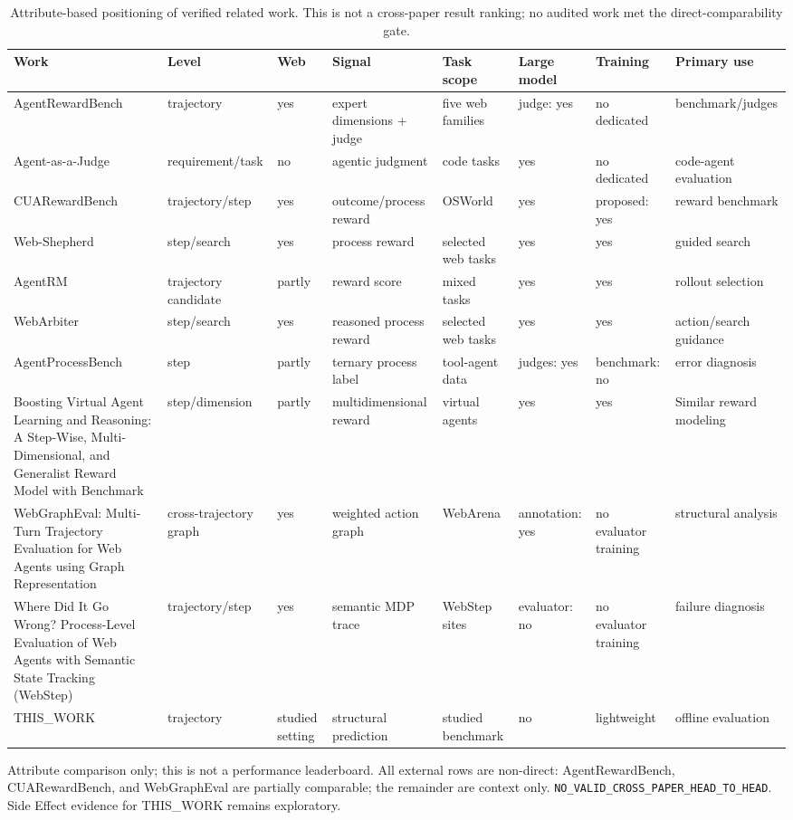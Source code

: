 \begin{table}[t]
\centering
\small
\caption{Attribute-based positioning of verified related work. This is not a cross-paper result ranking; no audited work met the direct-comparability gate.}
\label{tab:related_work_positioning}
\begin{tabular}{p{}p{}p{}p{}p{}p{}p{}p{}}
\hline
Work & Level & Web & Signal & Task scope & Large model & Training & Primary use \\
\hline
AgentRewardBench & trajectory & yes & expert dimensions + judge & five web families & judge: yes & no dedicated & benchmark/judges \\
Agent-as-a-Judge & requirement/task & no & agentic judgment & code tasks & yes & no dedicated & code-agent evaluation \\
CUARewardBench & trajectory/step & yes & outcome/process reward & OSWorld & yes & proposed: yes & reward benchmark \\
Web-Shepherd & step/search & yes & process reward & selected web tasks & yes & yes & guided search \\
AgentRM & trajectory candidate & partly & reward score & mixed tasks & yes & yes & rollout selection \\
WebArbiter & step/search & yes & reasoned process reward & selected web tasks & yes & yes & action/search guidance \\
AgentProcessBench & step & partly & ternary process label & tool-agent data & judges: yes & benchmark: no & error diagnosis \\
Boosting Virtual Agent Learning and Reasoning: A Step-Wise, Multi-Dimensional, and Generalist Reward Model with Benchmark & step/dimension & partly & multidimensional reward & virtual agents & yes & yes & Similar reward modeling \\
WebGraphEval: Multi-Turn Trajectory Evaluation for Web Agents using Graph Representation & cross-trajectory graph & yes & weighted action graph & WebArena & annotation: yes & no evaluator training & structural analysis \\
Where Did It Go Wrong? Process-Level Evaluation of Web Agents with Semantic State Tracking (WebStep) & trajectory/step & yes & semantic MDP trace & WebStep sites & evaluator: no & no evaluator training & failure diagnosis \\
THIS\_WORK & trajectory & studied setting & structural prediction & studied benchmark & no & lightweight & offline evaluation \\
\hline
\end{tabular}
\begin{flushleft}
\footnotesize Attribute comparison only; this is not a performance leaderboard. All external rows are non-direct: AgentRewardBench, CUARewardBench, and WebGraphEval are partially comparable; the remainder are context only. \texttt{NO\_VALID\_CROSS\_PAPER\_HEAD\_TO\_HEAD}. Side Effect evidence for THIS\_WORK remains exploratory.
\end{flushleft}
\end{table}
